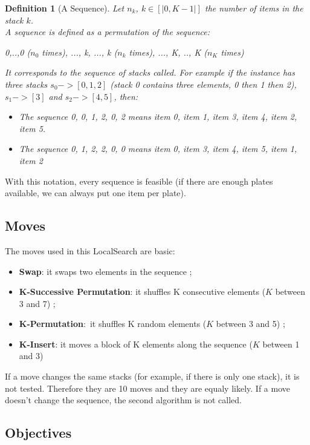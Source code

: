 \documentclass{article}
\newtheorem{definition}{Definition}
\begin{document}
\begin{definition}[A Sequence]
    Let $n_k$, $k \in [|0, K - 1|]$ the number of items in the stack $k$.\\
    A \textit{sequence} is defined as a permutation of the sequence:
\begin{center}0,..,0 ($n_0$ times), ..., k, ..., k ($n_k$ times), ..., K, .., K ($n_K$ times)\end{center}

    It corresponds to the sequence of stacks called. For example if the instance has three stacks $s_0 -> [0, 1, 2]$ (stack 0 contains three elements, 0 then 1 then 2), $s_1 -> [3] $ and $s_2 -> [4, 5]$, then:
    \begin{itemize}
        \item The sequence \textit{0, 0, 1, 2, 0, 2} means \textit{item 0, item 1, item 3, item 4, item 2, item 5}.
        \item The sequence \textit{0, 1, 2, 2, 0, 0} means \textit{item 0, item 3, item 4, item 5, item 1, item 2}
    \end{itemize}
\end{definition}

With this notation, every sequence is feasible (if there are enough plates available, we can always put one item per plate).

\subsection{Moves}

The moves used in this LocalSearch are basic: 
\begin{itemize}
    \item \textbf{Swap}: it swaps two elements in the sequence ;
    \item \textbf{K-Successive Permutation}: it shuffles K consecutive elements ($K$ between 3 and 7) ;
    \item \textbf{K-Permutation}: it shuffles K random elements ($K$ between 3 and 5) ;
    \item \textbf{K-Insert}: it moves a block of K elements along the sequence ($K$ between 1 and 3)
\end{itemize}
If a move changes the same stacks (for example, if there is only one stack), it is not tested. Therefore they are 10 moves and they are equaly likely. If a move doesn't change the sequence, the second algorithm is not called.

\subsection{Objectives}
\end{document}
